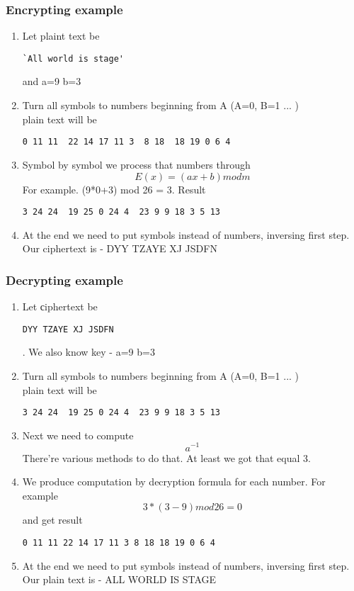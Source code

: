 \documentclass[10pt]{article}
\begin{document}
  \subsubsection{Encrypting example}
  \begin{enumerate}
  	\item Let plaint text be \begin{verbatim}`All world is stage'\end{verbatim} and a=9 b=3
  	\item Turn all symbols to numbers beginning from A (A=0, B=1 ... ) \\
  	plain text will be
  	 \begin{verbatim}0 11 11  22 14 17 11 3  8 18  18 19 0 6 4 \end{verbatim}
  	\item Symbol by symbol we process that numbers through 
  		\begin{equation} E(x) = (ax + b) mod m \end{equation}
  	For example. (9*0+3) mod 26 = 3. 
  	Result 
  		\begin{verbatim}3 24 24  19 25 0 24 4  23 9 9 18 3 5 13 \end{verbatim}
  	\item At the end we need to put symbols instead of numbers, inversing first step. 
  	Our ciphertext is - DYY TZAYE XJ JSDFN
  \end{enumerate}

  \subsubsection{Decrypting example}
  \begin{enumerate}
  	\item Let сiphertext be \begin{verbatim}DYY TZAYE XJ JSDFN\end{verbatim}. We also know key - a=9 b=3
  	\item Turn all symbols to numbers beginning from A (A=0, B=1 ... ) \\
  	plain text will be
  	 \begin{verbatim}3 24 24  19 25 0 24 4  23 9 9 18 3 5 13 \end{verbatim}
  	\item Next we need to compute \begin{equation}a^{-1}\end{equation} There're various methods to do that. At least we got that equal 3.
   	\item We produce computation by decryption formula for each number. For example \begin{equation} 3*(3-9) mod 26 = 0 \end{equation}
   	and get result \begin{verbatim}0 11 11 22 14 17 11 3 8 18 18 19 0 6 4\end{verbatim}

  	\item At the end we need to put symbols instead of numbers, inversing first step. Our plain text is - ALL WORLD IS STAGE 
  \end{enumerate}
\end{document}
